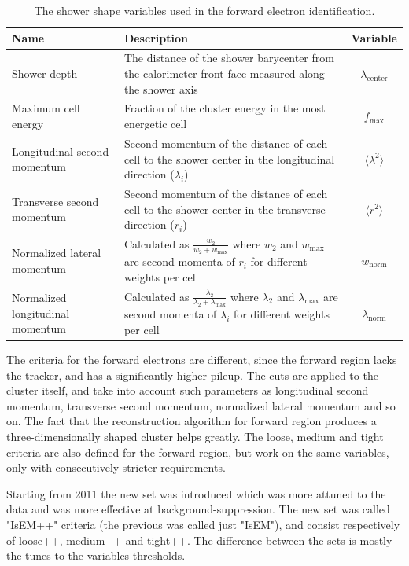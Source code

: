 \begin{table}
\begin{center}
\begin{tabular}{p{4cm}p{8cm}c}
\hline
\hline
Name & Description & Variable \\
\hline
Shower depth & The distance of the shower barycenter from the calorimeter front face measured along the shower axis & $\lambda_\mathrm{center}$ \\
Maximum cell energy & Fraction of the cluster energy in the most energetic cell & $f_\mathrm{max} $ \\
Longitudinal second momentum & Second momentum of the distance of each cell to the shower center in the longitudinal direction ($\lambda_i$) & $\langle \lambda^2 \rangle$ \\
Transverse second momentum & Second momentum of the distance of each cell to the shower center in the transverse direction ($r_i$) & $\langle r^2 \rangle$ \\
Normalized lateral momentum & Calculated as $\frac{w_2}{w_2+w_\mathrm{max}}$ where $w_2$ and $w_\mathrm{max}$ are second momenta of $r_i$ for different weights per cell & $w_\mathrm{norm}$ \\
Normalized longitudinal momentum & Calculated as $\frac{\lambda_2}{\lambda_2+\lambda_\mathrm{max}}$ where $\lambda_2$ and $\lambda_\mathrm{max}$ are second momenta of $\lambda_i$ for different weights per cell & $\lambda_\mathrm{norm}$ \\

\hline \hline

\end{tabular}
\caption{The shower shape variables used in the forward electron identification.}
\label{tab:rec_showershapes}
\end{center}
\end{table}


The criteria for the forward electrons are different, since the forward region lacks the tracker, and has a significantly higher pileup. The cuts are applied to the cluster itself, and take into account such parameters as longitudinal second momentum, transverse second momentum, normalized lateral momentum and so on. The fact that the reconstruction algorithm for forward region produces a three-dimensionally shaped cluster helps greatly. The loose, medium and tight criteria are also defined for the forward region, but work on the same variables, only with consecutively stricter requirements.

Starting from 2011 the new set was introduced which was more attuned to the data and was more effective at background-suppression. The new set was called "IsEM++" criteria (the previous was called just "IsEM"), and consist respectively of loose++, medium++ and tight++. The difference between the sets is mostly the tunes to the variables thresholds.

